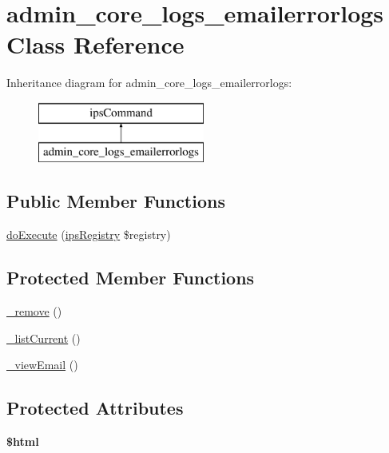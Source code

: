 \hypertarget{classadmin__core__logs__emailerrorlogs}{\section{admin\-\_\-core\-\_\-logs\-\_\-emailerrorlogs Class Reference}
\label{classadmin__core__logs__emailerrorlogs}
}
Inheritance diagram for admin\-\_\-core\-\_\-logs\-\_\-emailerrorlogs\-:\begin{figure}[H]
\begin{center}
\leavevmode
\includegraphics[height=2.000000cm]{classadmin__core__logs__emailerrorlogs}
\end{center}
\end{figure}
\subsection*{Public Member Functions}
\begin{DoxyCompactItemize}
\item 
\hyperlink{classadmin__core__logs__emailerrorlogs_afbc4e912a0604b94d47d66744c64d8ba}{do\-Execute} (\hyperlink{classips_registry}{ips\-Registry} \$registry)
\end{DoxyCompactItemize}
\subsection*{Protected Member Functions}
\begin{DoxyCompactItemize}
\item 
\hyperlink{classadmin__core__logs__emailerrorlogs_a6e3a0c448dcfd8610c6ddf42c6c660aa}{\-\_\-remove} ()
\item 
\hyperlink{classadmin__core__logs__emailerrorlogs_abc03e9ca0857dea04554a012ac374f5a}{\-\_\-list\-Current} ()
\item 
\hyperlink{classadmin__core__logs__emailerrorlogs_acd9f4a4f61f3d8ac70c6d500892e7a48}{\-\_\-view\-Email} ()
\end{DoxyCompactItemize}
\subsection*{Protected Attributes}
\begin{DoxyCompactItemize}
\item 
\hypertarget{classadmin__core__logs__emailerrorlogs_a6f96e7fc92441776c9d1cd3386663b40}{{\bfseries \$html}}\label{classadmin__core__logs__emailerrorlogs_a6f96e7fc92441776c9d1cd3386663b40}

\end{DoxyCompactItemize}
